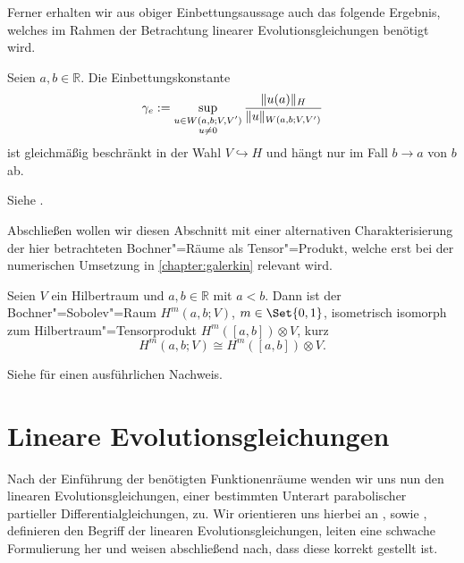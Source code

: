 \documentclass[../main.tex]{subfiles}
\begin{document}
Ferner erhalten wir aus obiger Einbettungsaussage auch das folgende Ergebnis, welches im Rahmen der Betrachtung linearer Evolutionsgleichungen benötigt wird.

\begin{Korollar}
\label{korollar:einbettungskonstante_M_e}
    Seien $a, b \in \mathbb{R}$.
    Die Einbettungskonstante
    \begin{equation}
        \label{eq:einbettungskonstante_M_e}
        \gamma_{e} := \sup_{\substack{u\in W(a, b; V, V')\\u \neq 0}} \frac{\lVert u(a)\rVert_{H}}{\lVert u\rVert_{W(a, b; V, V')}}
    \end{equation}
    ist gleichmäßig beschränkt in der Wahl $V \hookrightarrow H$ und hängt nur im Fall $b \to a$ von $b$ ab.

    \begin{Beweis}
        Siehe \cites[Section 5]{Schwab:2009ec}[Beweis zu Theorem XVIII.2.1]{Dautray:1992by}.
    \end{Beweis}
\end{Korollar}

Abschließen wollen wir diesen Abschnitt mit einer alternativen Charakterisierung der hier betrachteten Bochner"=Räume als Tensor"=Produkt, welche erst bei der numerischen Umsetzung in \cref{chapter:galerkin} relevant wird.

\begin{Satz}
\label{satz:bochner_sobolev_raum_als_tensorprodukt}
    Seien $V$ ein Hilbertraum und $a, b \in \mathbb{R}$ mit $a < b$.
    Dann ist der Bochner"=Sobolev"=Raum $H^{m}(a, b; V)$, $m \in \Set{0, 1}$, isometrisch isomorph zum Hilbertraum"=Tensorprodukt $H^{m}([a, b]) \otimes V$, kurz
    \begin{equation}
        H^{m}(a, b; V) \cong H^{m}([a, b]) \otimes V.
    \end{equation}

    \begin{Beweis}
        Siehe \cite[Theorem 12.6.1, Theorem 12.7.1]{Aubin:2000un} für einen ausführlichen Nachweis.
    \end{Beweis}
\end{Satz}


\section{Lineare Evolutionsgleichungen} %
\label{section:lineare_evolutionsgleichungen}

Nach der Einführung der benötigten Funktionenräume wenden wir uns nun den linearen Evolutionsgleichungen, einer bestimmten Unterart parabolischer partieller Differentialgleichungen, zu.
Wir orientieren uns hierbei an \textcite{Lions:1971wp}, \textcite{Schwab:2009ec} sowie \textcite{Urban:2014kg},
definieren den Begriff der linearen Evolutionsgleichungen, leiten eine schwache Formulierung her und weisen abschließend nach, dass diese korrekt gestellt ist.
\end{document}
